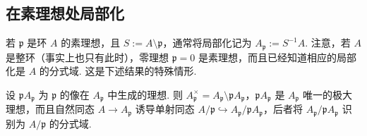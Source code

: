\subsection{在素理想处局部化}\label{sec:galois-1-6-6}
若 $\mathfrak p$ 是环 $A$ 的素理想，且 $S:=A\setminus\mathfrak p$，通常将局部化记为 $A_{\mathfrak p}:=S^{-1}A$. 注意，若 $A$ 是整环（事实上也只有此时），零理想 $\mathfrak p=0$ 是素理想，而且已经知道相应的局部化是 $A$ 的分式域. 这是下述结果的特殊情形.
\begin{proposition*}
设 $\mathfrak pA_{\mathfrak p}$ 为 $\mathfrak p$ 的像在 $A_{\mathfrak p}$ 中生成的理想. 则 $A_{\mathfrak p}^\times=A_{\mathfrak p}\setminus\mathfrak pA_{\mathfrak p}$，$\mathfrak pA_{\mathfrak p}$ 是 $A_{\mathfrak p}$ 唯一的极大理想，而且自然同态 $A\longrightarrow A_{\mathfrak p}$ 诱导单射同态 $A/\mathfrak p\hookrightarrow A_{\mathfrak p}/\mathfrak pA_{\mathfrak p}$，后者将 $A_{\mathfrak p}/\mathfrak pA_{\mathfrak p}$ 识别为 $A/\mathfrak p$ 的分式域.
\end{proposition*}

